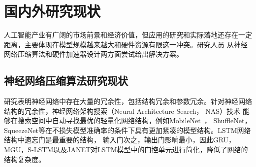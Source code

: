 

\section{国内外研究现状}
人工智能产业有广阔的市场前景和经济价值，但应用的研究和实际落地还存在一定距离，主要体现在模型规模越来越大和硬件资源有限这一冲突。研究人员
从神经网络压缩算法和硬件加速器设计两方面尝试给出解决方案。

\subsection{神经网络压缩算法研究现状}
研究表明神经网络中存在大量的冗余性，包括结构冗余和参数冗余。针对神经网络结构的冗余性，神经网络架构搜索（Neural Architecture Search， NAS）技术
能够在搜索空间中自动寻找最优的轻量化网络结构，例如MobileNet~，
ShuffleNet，SqueezeNet等在不损失模型准确率的条件下具有更加紧凑的模型结构。LSTM网络结构中遗忘门是最重要的结构，
输入门次之，输出门影响最小，因此GRU，MGU，S-LSTM以及JANET对LSTM模型中的门控单元进行简化，降低了网络的结构复杂度。

